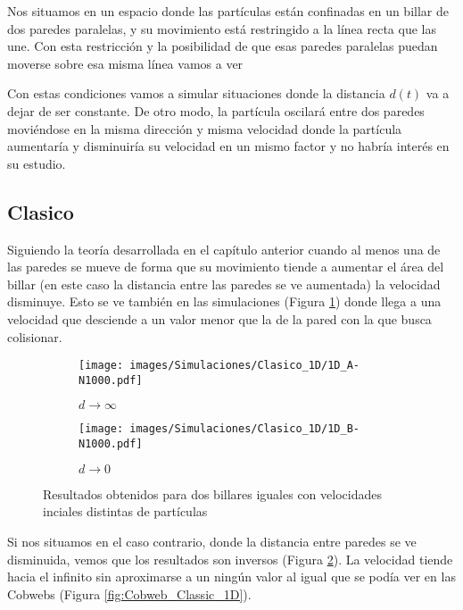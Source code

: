 Nos situamos en un espacio donde las partículas están confinadas en un billar de dos paredes paralelas, y su movimiento está restringido a la línea recta que las une. Con esta restricción y la posibilidad de que esas paredes paralelas puedan moverse sobre esa misma línea vamos a ver 

\vspace{3mm}

Con estas condiciones vamos a simular situaciones donde la distancia \( d(t) \) va a dejar de ser constante. De otro modo, la partícula oscilará entre dos paredes moviéndose en la misma dirección y misma velocidad donde la partícula aumentaría y disminuiría su velocidad en un mismo factor y no habría interés en su estudio.

\subsection{Clasico}

Siguiendo la teoría desarrollada en el capítulo anterior cuando al menos una de las paredes se mueve de forma que su movimiento tiende a aumentar el área del billar (en este caso la distancia entre las paredes se ve aumentada) la velocidad disminuye. Esto se ve también en las simulaciones (Figura \ref{fig:clasico_1D_A}) donde llega a una velocidad que desciende a un valor menor que la de la pared con la que busca colisionar.

\begin{figure}[!h]
    \begin{subfigure}[b]{0.5\textwidth}
        \centering
        \texttt{[image: images/Simulaciones/Clasico\_1D/1D\_A-N1000.pdf]}
        \caption{\( d \rightarrow \infty \)}
        \label{fig:clasico_1D_A}
    \end{subfigure}
    \hfill
    \begin{subfigure}[b]{0.5\textwidth}
        \centering
        \texttt{[image: images/Simulaciones/Clasico\_1D/1D\_B-N1000.pdf]}
        \caption{\( d \rightarrow 0 \)}
        \label{fig:clasico_1D_B}
    \end{subfigure}
    \caption{Resultados obtenidos para dos billares iguales con velocidades inciales distintas de partículas}
    \label{fig:clasico_1D}
\end{figure}

Si nos situamos en el caso contrario, donde la distancia entre paredes se ve disminuida, vemos que los resultados son inversos (Figura \ref{fig:clasico_1D_B}). La velocidad tiende hacia el infinito sin aproximarse a un ningún valor al igual que se podía ver en las Cobwebs (Figura \ref{fig:Cobweb_Classic_1D}). 

